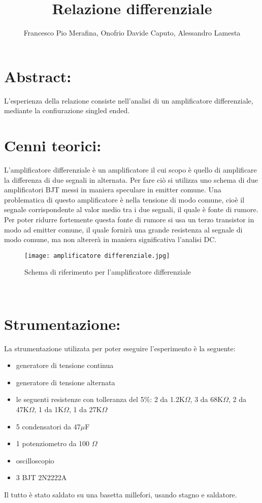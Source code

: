\documentclass{article}
\title{Relazione differenziale}
\author{Francesco Pio Merafina, Onofrio Davide Caputo, Alessandro Lamesta}
\begin{document}
\maketitle

\section{Abstract:}
L'esperienza della relazione consiste nell'analisi di un amplificatore differenziale, mediante la confiurazione singled ended.
~
\section{Cenni teorici:}
L'amplificatore differenziale è un amplificatore il cui scopo è quello di amplificare la differenza di due segnali in alternata. Per fare ciò si utilizza uno schema di due amplificatori BJT messi in maniera speculare in emitter comune. Una problematica di questo amplificatore è nella tensione di modo comune, cioè il segnale corrispondente al valor medio tra i due segnali, il quale è fonte di rumore. Per poter ridurre fortemente questa fonte di rumore si usa un terzo transistor in modo ad emitter comune, il quale fornirà una grande resistenza al segnale di modo comune, ma non altererà in maniera significativa l'analisi DC.
~
\begin{figure}[h!]
    \centering
    \texttt{[image: amplificatore differenziale.jpg]} 
    \caption{Schema di riferimento per l'amplificatore differenziale}
    \label{figura1}
\end{figure}
~
\section{Strumentazione:}
La strumentazione utilizata per poter eseguire l'esperimento è la seguente:
\begin{itemize}
    \item generatore di tensione continua
    \item generatore di tensione alternata
    \item le seguenti resistenze con tolleranza del 5$\%$: 2 da 1.2K$\Omega$, 3 da 68K$\Omega$, 2 da 47K$\Omega$, 1 da 1K$\Omega$, 1 da 27K$\Omega$ 
    \item 5 condensatori da 47$\mu$F
    \item 1 potenziometro da 100 $\Omega$
    \item oscilloscopio
    \item 3 BJT 2N2222A
\end{itemize}
Il tutto è stato saldato su una basetta millefori, usando stagno e saldatore.
~
\end{document}
